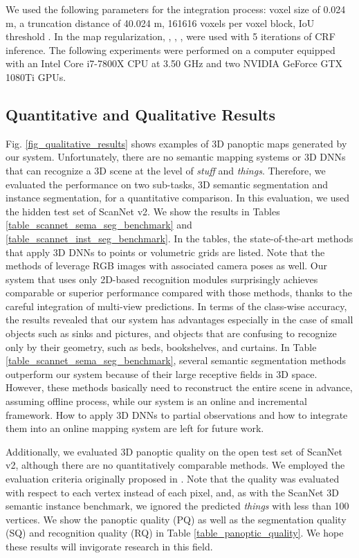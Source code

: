 \documentclass[letterpaper, 10pt, conference]{latex_template/ieeeconf}
\begin{document}
We used the following parameters for the integration process: voxel size of 0.024 m, a truncation distance of 40.024 m, 161616 voxels per voxel block, IoU threshold .
In the map regularization, , , ,  were used with 5 iterations of CRF inference.
The following experiments were performed on a computer equipped with an Intel Core i7-7800X CPU at 3.50 GHz and two NVIDIA GeForce GTX 1080Ti GPUs.

\subsection{Quantitative and Qualitative Results}
Fig. \ref{fig_qualitative_results} shows examples of 3D panoptic maps generated by our system.
Unfortunately, there are no semantic mapping systems or 3D DNNs that can recognize a 3D scene at the level of {\it stuff} and {\it things}.
Therefore, we evaluated the performance on two sub-tasks, 3D semantic segmentation and instance segmentation, for a quantitative comparison.
In this evaluation, we used the hidden test set of ScanNet v2. 
We show the results in Tables \ref{table_scannet_sema_seg_benchmark} and \ref{table_scannet_inst_seg_benchmark}.
In the tables, the state-of-the-art methods that apply 3D DNNs to points or volumetric grids are listed.
Note that the methods of \cite{huang2018texturenet,dai20183dmv,hou20183d} leverage RGB images with associated camera poses as well.
Our system that uses only 2D-based recognition modules surprisingly achieves comparable or superior performance compared with those methods, thanks to the careful integration of multi-view predictions.
In terms of the class-wise accuracy, the results revealed that our system has advantages especially in the case of small objects such as sinks and pictures, and objects that are confusing to recognize only by their geometry, such as beds, bookshelves, and curtains.
In Table \ref{table_scannet_sema_seg_benchmark}, several semantic segmentation methods outperform our system because of their large receptive fields in 3D space. However, these methods basically need to reconstruct the entire scene in advance, assuming offline process, while our system is an online and incremental framework.
How to apply 3D DNNs to partial observations and how to integrate them into an online mapping system are left for future work.

Additionally, we evaluated 3D panoptic quality on the open test set of ScanNet v2, although there are no quantitatively comparable methods.
We employed the evaluation criteria originally proposed in \cite{kirillov2018panoptic}.
Note that the quality was evaluated with respect to each vertex instead of each pixel, and, as with the ScanNet 3D semantic instance benchmark, we ignored the predicted {\it things} with less than 100 vertices.
We show the panoptic quality (PQ) as well as the segmentation quality (SQ) and recognition quality (RQ) in Table \ref{table_panoptic_quality}.
We hope these results will invigorate research in this field.
\end{document}
